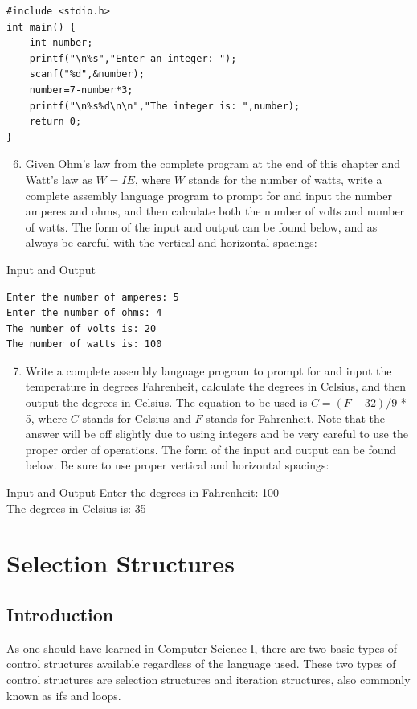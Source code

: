 \documentclass[10pt]{book}
\begin{document}
\begin{verbatim}
#include <stdio.h>
int main() {
    int number;
    printf("\n%s","Enter an integer: ");
    scanf("%d",&number);
    number=7-number*3;
    printf("\n%s%d\n\n","The integer is: ",number);
    return 0;
}
\end{verbatim}

\begin{enumerate}
  \setcounter{enumi}{5}
  \item Given Ohm's law from the complete program at the end of this chapter and Watt's law as $W=I E$, where $W$ stands for the number of watts, write a complete assembly language program to prompt for and input the number amperes and ohms, and then calculate both the number of volts and number of watts. The form of the input and output can be found below, and as always be careful with the vertical and horizontal spacings:
\end{enumerate}

Input and Output
\begin{verbatim}
Enter the number of amperes: 5
Enter the number of ohms: 4
The number of volts is: 20
The number of watts is: 100
\end{verbatim}

\begin{enumerate}
  \setcounter{enumi}{6}
  \item Write a complete assembly language program to prompt for and input the temperature in degrees Fahrenheit, calculate the degrees in Celsius, and then output the degrees in Celsius. The equation to be used is $C=(F-32) / 9$ * 5, where $C$ stands for Celsius and $F$ stands for Fahrenheit. Note that the answer will be off slightly due to using integers and be very careful to use the proper order of operations. The form of the input and output can be found below. Be sure to use proper vertical and horizontal spacings:
\end{enumerate}

Input and Output
Enter the degrees in Fahrenheit: 100\\
The degrees in Celsius is: 35

\chapter{Selection Structures}
\section{Introduction}
As one should have learned in Computer Science I, there are two basic types of control structures available regardless of the language used. These two types of control structures are selection structures and iteration structures, also commonly known as ifs and loops.
\end{document}
